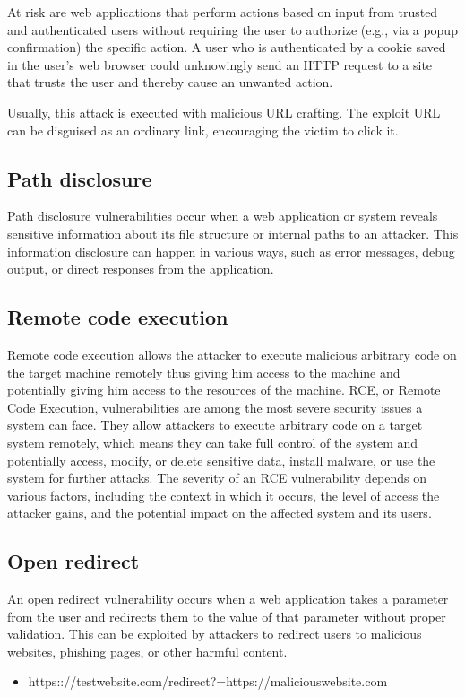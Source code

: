         At risk are web applications that perform actions based on input from trusted and authenticated users without requiring the user to authorize (e.g., via a popup confirmation) the specific action. A user who is authenticated by a cookie saved in the user's web browser could unknowingly send an HTTP request to a site that trusts the user and thereby cause an unwanted action. 
        
        Usually, this attack is executed with malicious URL crafting. 
        The exploit URL can be disguised as an ordinary link, encouraging the victim to click it.
    
\subsection{Path disclosure}

    Path disclosure vulnerabilities occur when a web application or system reveals sensitive information about its file structure or internal paths to an attacker. 
    This information disclosure can happen in various ways, such as error messages, debug output, or direct responses from the application.
    
\subsection{Remote code execution}

        Remote code execution allows the attacker to execute malicious arbitrary code on the target machine remotely thus giving him access to the machine and potentially giving him access to the resources of the machine. RCE, or Remote Code Execution, vulnerabilities are among the most severe security issues a system can face. They allow attackers to execute arbitrary code on a target system remotely, which means they can take full control of the system and potentially access, modify, or delete sensitive data, install malware, or use the system for further attacks. The severity of an RCE vulnerability depends on various factors, including the context in which it occurs, the level of access the attacker gains, and the potential impact on the affected system and its users.

\subsection{Open redirect}

        An open redirect vulnerability occurs when a web application takes a parameter from the user and redirects them to the value of that parameter without proper validation. This can be exploited by attackers to redirect users to malicious websites, phishing pages, or other harmful content. 
        \begin{itemize}
            \item  https:://testwebsite.com/redirect?=https://maliciouswebsite.com
        \end{itemize}     
